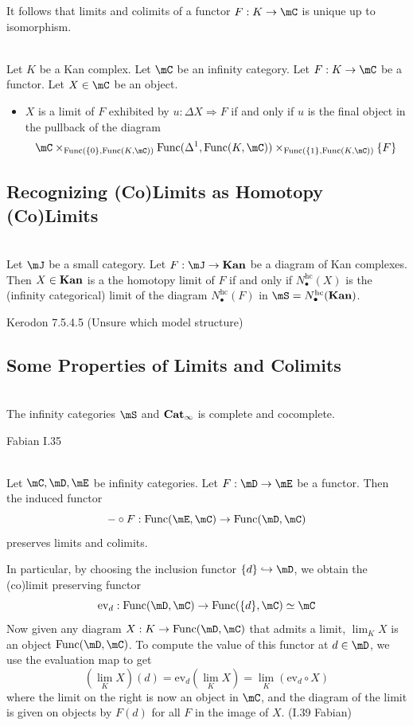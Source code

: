 \documentclass[a4paper]{article}
\begin{document}
It follows that limits and colimits of a functor $F:K\to\mC$ is unique up to isomorphism. 

\begin{prp}{}{}\\ Let $K$ be a Kan complex. Let $\mC$ be an infinity category. Let $F:K\to\mC$ be a functor. Let $X\in\mC$ be an object. 
\begin{itemize}
\item $X$ is a limit of $F$ exhibited by $u:\Delta X\Rightarrow F$ if and only if $u$ is the final object in the pullback of the diagram $$\mC\times_{\text{Func}(\{0\},\text{Func}(K,\mC))}\text{Func}(\Delta^1,\text{Func}(K,\mC))\times_{\text{Func}(\{1\},\text{Func}(K,\mC))}\{F\}$$
\end{itemize}
\end{prp}

\subsection{Recognizing (Co)Limits as Homotopy (Co)Limits}
\begin{prp}{}{}\\ Let $\mJ$ be a small category. Let $F:\mJ\to\bold{Kan}$ be a diagram of Kan complexes. Then $X\in\bold{Kan}$ is a the homotopy limit of $F$ if and only if $N_\bullet^\text{hc}(X)$ is the (infinity categorical) limit of the diagram $N_\bullet^\text{hc}(F)$ in $\mS=N_\bullet^\text{hc}(\bold{Kan})$. 
\end{prp}

Kerodon 7.5.4.5 (Unsure which model structure)

\subsection{Some Properties of Limits and Colimits}
\begin{prp}{}{}\\ The infinity categories $\mS$ and $\bold{Cat}_\infty$ is complete and cocomplete. 
\end{prp}

Fabian I.35

\begin{prp}{}{}\\ Let $\mC,\mD,\mE$ be infinity categories. Let $F:\mD\to\mE$ be a functor. Then the induced functor $$-\circ F:\text{Func}(\mE,\mC)\to\text{Func}(\mD,\mC)$$ preserves limits and colimits. 
\end{prp}

In particular, by choosing the inclusion functor $\{d\}\hookrightarrow\mD$, we obtain the (co)limit preserving functor $$\text{ev}_d:\text{Func}(\mD,\mC)\to\text{Func}(\{d\},\mC)\simeq\mC$$ Now given any diagram $X:K\to\text{Func}(\mD,\mC)$ that admits a limit, $\lim_K X$ is an object $\text{Func}(\mD,\mC)$. To compute the value of this functor at $d\in\mD$, we use the evaluation map to get $$\left(\lim_K X\right)(d)=\text{ev}_d\left(\lim_KX\right)=\lim_K(\text{ev}_d\circ X)$$ where the limit on the right is now an object in $\mC$, and the diagram of the limit is given on objects by $F(d)$ for all $F$ in the image of $X$. (I.39 Fabian)
\end{document}
